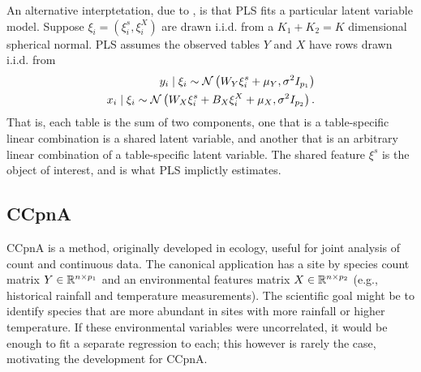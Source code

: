 \documentclass{article}
\begin{document}
An alternative interptetation, due to \citep{gustafsson2001probabilistic}, is
that PLS fits a particular latent variable model. Suppose $\xi_{i} =
\left(\xi_{i}^{s}, \xi_{i}^{X}\right)$ are drawn i.i.d. from a $K_{1} + K_{2} =
K$ dimensional spherical normal. PLS assumes the observed tables $Y$ and $X$
have rows drawn i.i.d. from
\begin{align*}
y_{i} \mid \xi_{i} \sim \mathcal{N}\left(W_{Y}\xi_{i}^{s} +
\mu_{Y}, \sigma^{2}I_{p_{1}}\right) \\
x_{i} \mid \xi_{i} \sim \mathcal{N}\left(W_{X} \xi_{i}^{s} + B_{X}\xi_{i}^{X} +
\mu_{X}, \sigma^{2}I_{p_{2}}\right).
\end{align*}
That is, each table is the sum of two components, one that is a
table-specific linear combination is a shared latent variable, and
another that is an arbitrary linear combination of a table-specific
latent variable. The shared feature $\xi^{s}$ is the object of
interest, and is what PLS implictly estimates.

\subsection{CCpnA}
\label{subsec:canonical-correspondence}

CCpnA is a method, originally developed in ecology, useful for joint analysis of
count and continuous data. The canonical application has a site by species count
matrix $Y \in \mathbb{R}^{n \times p_{1}}$ and an environmental features matrix $X
\in \mathbb{R}^{n \times p_{2}}$ (e.g., historical rainfall and temperature
measurements). The scientific goal might be to identify species that are more
abundant in sites with more rainfall or higher temperature. If these
environmental variables were uncorrelated, it would be enough to fit a separate
regression to each; this however is rarely the case, motivating the development
for CCpnA.
\end{document}
